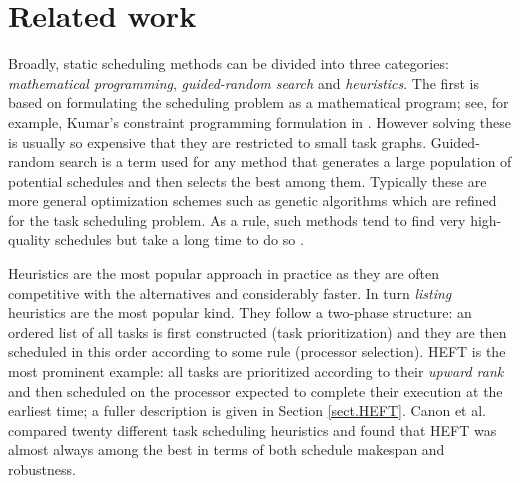 \documentclass[runningheads]{llncs}
\begin{document}
\section{Related work}
\label{sect.lit_review}


Broadly, static scheduling methods can be divided into three categories: {\em mathematical programming}, {\em guided-random search} and {\em heuristics}. The first is based on formulating the scheduling problem as a mathematical program; see, for example, Kumar's constraint programming formulation in \cite{kumar:tel-01538516}. However solving these is usually so expensive that they are restricted to small task graphs. Guided-random search is a term used for any method that generates a large population of potential schedules and then selects the best among them. Typically these are more general optimization schemes such as genetic algorithms which are refined for the task scheduling problem. As a rule, such methods tend to find very high-quality schedules but take a long time to do so \cite{BRAUN2001810}. 

Heuristics are the most popular approach in practice as they are often competitive with the alternatives and considerably faster. In turn {\em listing} heuristics are the most popular kind. They follow a two-phase structure: an ordered list of all tasks is first constructed (task prioritization) and they are then scheduled in this order according to some rule (processor selection). HEFT is the most prominent example: all tasks are prioritized according to their {\em upward rank} and then scheduled on the processor expected to complete their execution at the earliest time; a fuller description is given in Section \ref{sect.HEFT}. Canon et al. \cite{canon2008comparative} compared twenty different task scheduling heuristics and found that HEFT was almost always among the best in terms of both schedule makespan and robustness.

\end{document}
